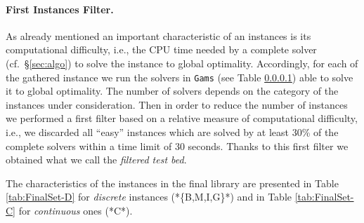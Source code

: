 \paragraph{First Instances Filter.} As already mentioned an important characteristic of an instances is its computational difficulty, i.e., the CPU time needed by a complete solver (cf.~\S \ref{sec:algo}) to solve the instance to global optimality. Accordingly, for each of the gathered instance we run the solvers in {\tt Gams} (see Table \ref{}) able to solve it to global optimality. The number of solvers depends on the category of the instances under consideration. Then in order to reduce the number of instances we performed a first filter based on a relative measure of computational difficulty, i.e., we discarded all ``easy'' instances which are solved by at least 30\% of the complete solvers within a time limit of 30 seconds. Thanks to this first filter we obtained what we call the {\it filtered test bed}.



\bigskip
The characteristics of the instances in the final library are presented in Table \ref{tab:FinalSet-D} for \emph{discrete} instances (*\{B,M,I,G\}*) and in Table \ref{tab:FinalSet-C} for \emph{continuous} ones (*C*).

